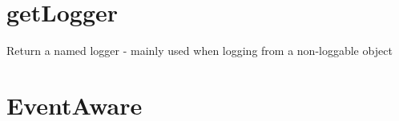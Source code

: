 \documentclass[letterpaper,10pt,english]{sphinxmanual}
\begin{document}
\section{getLogger}
\label{common:getlogger}

\begin{fulllineitems}
\label{common:registry.getLogger}
Return a named logger - mainly used when logging from a non-loggable object

\end{fulllineitems}



\section{EventAware}
\label{common:eventaware}
\end{document}
